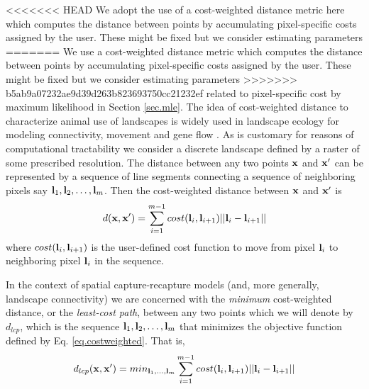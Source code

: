 \documentclass[12pt]{article}
\begin{document}
<<<<<<< HEAD
We adopt the use of a cost-weighted distance metric here which
computes the
distance between points by accumulating pixel-specific costs assigned
by the user.
These might be fixed but we  consider estimating parameters
=======
We use a cost-weighted distance metric
which computes the distance
between points by accumulating pixel-specific costs assigned by the
user. These might be fixed but we  consider estimating parameters
>>>>>>> b5ab9a07232ae9d39d263b823693750cc21232ef
related to pixel-specific cost by maximum likelihood in Section \ref{sec.mle}.
The idea of cost-weighted distance to characterize animal use of
landscapes  is widely used in
landscape ecology for modeling connectivity, movement and gene flow
\citep{adriaensen_etal:2003}. As is customary for reasons of
computational tractability we consider a discrete landscape defined by a
raster of some prescribed resolution. The distance between any two points
${\bf x}$ and ${\bf x}'$ can be represented by a sequence of line segments
connecting a sequence of neighboring  pixels say
${\bf l}_{1},{\bf l}_{2},\ldots,{\bf l}_{m}$. Then the cost-weighted distance
between ${\bf x}$ and ${\bf x}'$ is
\begin{equation}
 d({\bf x},{\bf x}')
  =  \sum_{i=1}^{m-1} cost({\bf l}_{i},{\bf l}_{i+1})||{\bf l}_{i} - {\bf l}_{i+1}||
\label{eq.costweighted}
\end{equation}
where $cost({\bf l}_{i},{\bf l}_{i+1})$ is the user-defined cost function
to move
from pixel ${\bf l}_{i}$ to neighboring pixel ${\bf l}_{i}$ in the sequence.

In the context of
spatial capture-recapture models (and, more generally, landscape
connectivity) we are concerned with the {\it minimum} cost-weighted
distance, or the {\it least-cost path}, between any two points which
we will denote by $d_{lcp}$, which is
the
sequence ${\bf l}_{1},{\bf l}_{2},\ldots,{\bf l}_{m}$ that minimizes
the objective function defined by Eq. \ref{eq.costweighted}. That is,
\begin{equation}
 d_{lcp}({\bf x},{\bf x}')
  =  min_{{\bf l}_{1},\ldots,{\bf l}_{m}}  \sum_{i=1}^{m-1} cost({\bf l}_{i},{\bf l}_{i+1})||{\bf l}_{i} - {\bf l}_{i+1}||
\label{eq.lcp}
\end{equation}
\end{document}
